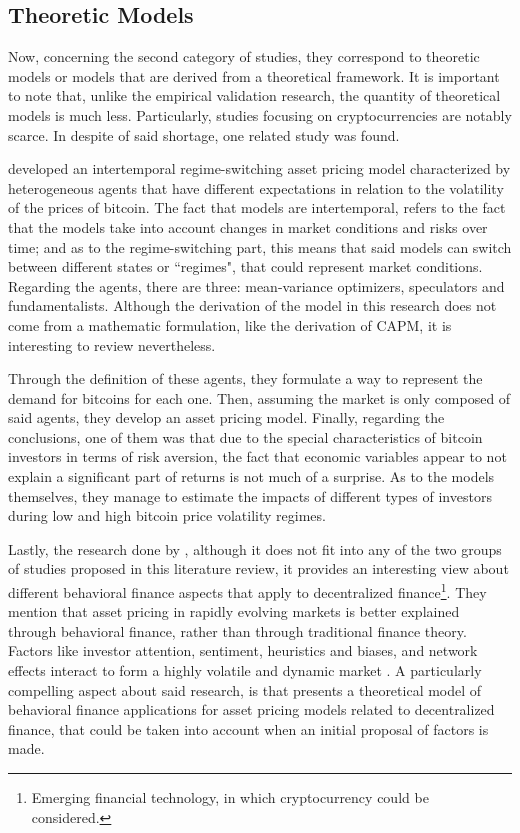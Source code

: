 \subsection{Theoretic Models}
Now, concerning the second category of studies, they correspond to theoretic models or models that are derived from a theoretical framework. It is important to note that, unlike the empirical validation research, the quantity of theoretical models is much less. Particularly, studies focusing on cryptocurrencies are notably scarce. In despite of said shortage, one related study was found.

\parencite{koutmos2021intertemporal} developed an intertemporal regime-switching asset pricing model characterized by heterogeneous agents that have different expectations in relation to the volatility of the prices of bitcoin. The fact that models are intertemporal, refers to the fact that the models take into account changes in market conditions and risks over time; and as to the regime-switching part, this means that said models can switch between different states or ``regimes", that could represent market conditions. Regarding the agents, there are three: mean-variance optimizers, speculators and fundamentalists. Although the derivation of the model in this research does not come from a mathematic formulation, like the derivation of CAPM, it is interesting to review nevertheless. 

Through the definition of these agents, they formulate a way to represent the demand for bitcoins for each one. Then, assuming the market is only composed of said agents, they develop an asset pricing model. Finally, regarding the conclusions, one of them was that due to the special characteristics of bitcoin investors in terms of risk aversion, the fact that economic variables appear to not explain a significant part of returns is not much of a surprise. As to the models themselves, they manage to estimate the impacts of different types of investors during low and high bitcoin price volatility regimes. 

Lastly, the research done by \parencite{Bennett2023}, although it does not fit into any of the two groups of studies proposed in this literature review, it provides an interesting view about different behavioral finance aspects that apply to decentralized finance\footnote{Emerging financial technology, in which cryptocurrency could be considered.}. They mention that asset pricing in rapidly evolving markets is better explained through behavioral finance, rather than through traditional finance theory. Factors like investor attention, sentiment, heuristics and biases, and network effects interact to form a highly volatile and dynamic market \parencite{Bennett2023}. A particularly compelling aspect about said research, is that presents a theoretical model of behavioral finance applications for asset pricing models related to decentralized finance, that could be taken into account when an initial proposal of factors is made. 

